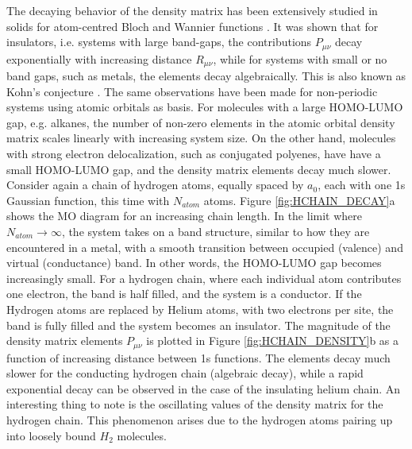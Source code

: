 The decaying behavior of the density matrix has been extensively studied in solids for atom-centred Bloch and Wannier functions \cite{Koh1959,Ism1999,Goe1994,Goe1998,Tar2002}. It was shown that for insulators, i.e. systems with large band-gaps, the contributions $P_{\mu\nu}$ decay exponentially with increasing distance $R_{\mu\nu}$, while for systems with small or no band gaps, such as metals, the elements decay algebraically. This is also known as Kohn's conjecture \cite{Koh1959}.  
The same observations have been made for non-periodic systems using atomic orbitals as basis. For molecules with a large HOMO-LUMO gap, e.g. alkanes, the number of non-zero elements in the atomic orbital density matrix scales linearly with increasing system size. On the other hand, molecules with strong electron delocalization, such as conjugated polyenes, have have a small HOMO-LUMO gap, and the density matrix elements decay much slower. 
Consider again a chain of hydrogen atoms, equally spaced by $a_0$, each with one 1s Gaussian function, this time with $N_{atom}$ atoms. Figure \ref{fig:HCHAIN_DECAY}a shows the MO diagram for an increasing chain length. In the limit where $N_{atom} \rightarrow \infty$, the system takes on a band structure, similar to how they are encountered in a metal, with a smooth transition between occupied (valence) and virtual (conductance) band. In other words, the HOMO-LUMO gap becomes increasingly small. For a hydrogen chain, where each individual atom contributes one electron, the band is half filled, and the system is a conductor. If the Hydrogen atoms are replaced by Helium atoms, with two electrons per site, the band is fully filled and the system becomes an insulator.
The magnitude of the density matrix elements $P_{\mu\nu}$ is plotted in Figure \ref{fig:HCHAIN_DENSITY}b as a function of increasing distance between 1s functions. The elements decay much slower for the conducting hydrogen chain (algebraic decay), while a rapid exponential decay can be observed in the case of the insulating helium chain. An interesting thing to note is the oscillating values of the density matrix for the hydrogen chain. This phenomenon arises due to the hydrogen atoms pairing up into loosely bound $H_2$ molecules. 

